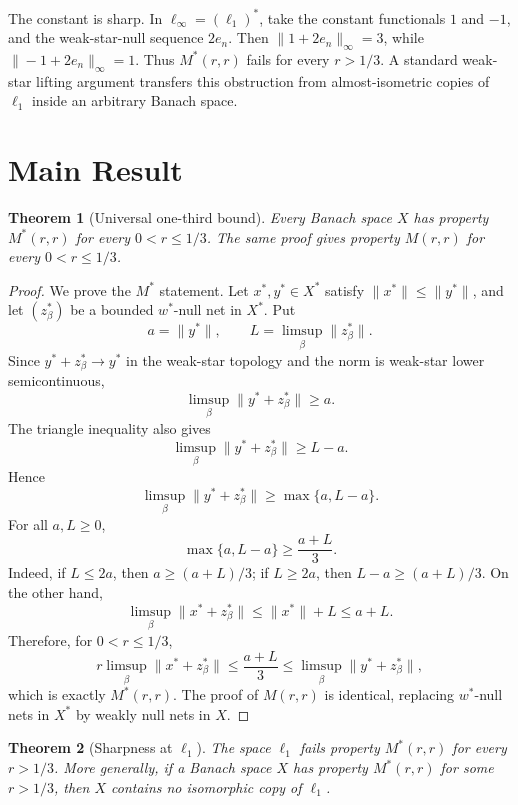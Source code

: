 \documentclass[11pt]{article}
\newtheorem{theorem}{Theorem}
\newcommand{\ellone}{\ell_1}
\newcommand{\ellinf}{\ell_\infty}
\newcommand{\weakstar}{w^*}
\begin{document}
The constant is sharp.  In \(\ellinf=(\ellone)^*\), take the constant
functionals \(1\) and \(-1\), and the weak-star-null sequence \(2e_n\).  Then
\(\|1+2e_n\|_\infty=3\), while \(\|-1+2e_n\|_\infty=1\).  Thus \(M^*(r,r)\)
fails for every \(r>1/3\).  A standard weak-star lifting argument transfers
this obstruction from almost-isometric copies of \(\ellone\) inside an arbitrary
Banach space.

\section*{Main Result}

\begin{theorem}[Universal one-third bound]
\label{thm:universal}
Every Banach space \(X\) has property \(M^*(r,r)\) for every \(0<r\leq 1/3\).
The same proof gives property \(M(r,r)\) for every \(0<r\leq 1/3\).
\end{theorem}

\begin{proof}
We prove the \(M^*\) statement.  Let \(x^*,y^*\in X^*\) satisfy
\(\|x^*\|\leq\|y^*\|\), and let \((z_\beta^*)\) be a bounded \(\weakstar\)-null
net in \(X^*\).  Put
\[
    a=\|y^*\|,\qquad L=\limsup_\beta \|z_\beta^*\|.
\]
Since \(y^*+z_\beta^*\to y^*\) in the weak-star topology and the norm is
weak-star lower semicontinuous,
\[
    \limsup_\beta \|y^*+z_\beta^*\|\geq a.
\]
The triangle inequality also gives
\[
    \limsup_\beta \|y^*+z_\beta^*\|\geq L-a.
\]
Hence
\[
    \limsup_\beta \|y^*+z_\beta^*\|
    \geq
    \max\{a,L-a\}.
\]
For all \(a,L\geq0\),
\[
    \max\{a,L-a\}\geq \frac{a+L}{3}.
\]
Indeed, if \(L\leq 2a\), then \(a\geq(a+L)/3\); if \(L\geq2a\), then
\(L-a\geq(a+L)/3\).  On the other hand,
\[
    \limsup_\beta \|x^*+z_\beta^*\|
    \leq
    \|x^*\|+L
    \leq
    a+L.
\]
Therefore, for \(0<r\leq1/3\),
\[
    r\limsup_\beta \|x^*+z_\beta^*\|
    \leq
    \frac{a+L}{3}
    \leq
    \limsup_\beta \|y^*+z_\beta^*\|,
\]
which is exactly \(M^*(r,r)\).  The proof of \(M(r,r)\) is identical, replacing
\(\weakstar\)-null nets in \(X^*\) by weakly null nets in \(X\).
\end{proof}

\begin{theorem}[Sharpness at \(\ell_1\)]
\label{thm:sharp}
The space \(\ellone\) fails property \(M^*(r,r)\) for every \(r>1/3\).
More generally, if a Banach space \(X\) has property \(M^*(r,r)\) for some
\(r>1/3\), then \(X\) contains no isomorphic copy of \(\ellone\).
\end{theorem}
\end{document}
